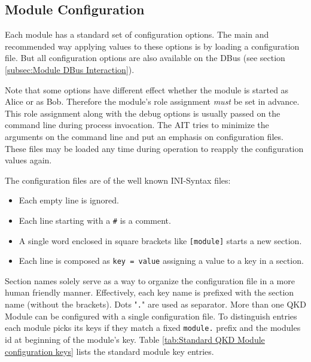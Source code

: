 \subsection{Module Configuration}
\label{subsec:Module Configuration}

Each module has a standard set of configuration options. The main and recommended way applying values to these options is by loading a configuration file. But all configuration options are also available on the DBus (see section \ref{subsec:Module DBus Interaction}).

\medskip

Note that some options have different effect whether the module is started as Alice or as Bob. Therefore the module's role assignment \emph{must} be set in advance. This role assignment along with the debug options is usually passed on the command line during process invocation. The AIT tries to minimize the arguments on the command line and put an emphasis on configuration files. These files may be loaded any time during operation to reapply the configuration values again.

\medskip

The configuration files are of the well known INI-Syntax files:

\begin{itemize}

\item Each empty line is ignored.

\item Each line starting with a \texttt{\#} is a comment.

\item A single word enclosed in square brackets like \texttt{[module]} starts a new section.

\item Each line is composed as \texttt{key = value} assigning a value to a key in a section.

\end{itemize}

\medskip

Section names solely serve as a way to organize the configuration file in a more human friendly manner. Effectively, each key name is prefixed with the section name (without the brackets). Dots "\texttt{.}" are used as separator. More than one QKD Module can be configured with a single configuration file. To distinguish entries each module picks its keys if they match a fixed \texttt{module.} prefix and the modules id at beginning of the module's key. Table \ref{tab:Standard QKD Module configuration keys} lists the standard module key entries.

